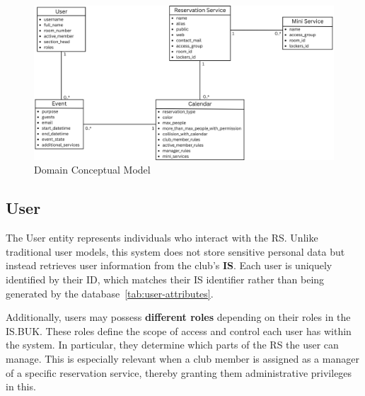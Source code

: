\begin{figure}[!htbp]
  \centering
  \includegraphics[width=\linewidth]{images/diagram}
  \caption{Domain Conceptual Model~\cite{UMLdiagram}}
  \label{fig:diagram}
\end{figure}

\subsection{User}

The User entity represents individuals who interact with the RS. Unlike traditional user models, this system does not store sensitive personal data but instead retrieves user information from the club’s \textbf{IS}. Each user is uniquely identified by their ID, which matches their IS identifier rather than being generated by the database~\ref{tab:user-attributes}.

Additionally, users may possess \textbf{different roles} depending on their roles in the IS.BUK. These roles define the scope of access and control each user has within the system. In particular, they determine which parts of the RS the user can manage. This is especially relevant when a club member is assigned as a manager of a specific reservation service, thereby granting them administrative privileges in this.

